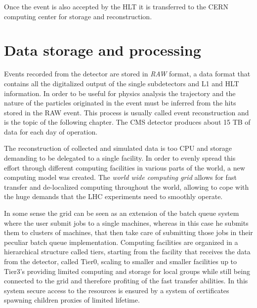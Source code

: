 Once the event is also accepted by the HLT it is transferred to the CERN computing center for storage and reconstruction.

\section{Data storage and processing}

Events recorded from the detector are stored in \emph{RAW} format, a data format that contains all the digitalized output of the single subdetectors and L1 and HLT information. In order to be useful for physics analysis the trajectory and the nature of the particles originated in the event must be inferred from the hits stored in the RAW event. This process is usually called event reconstruction and is the topic of the following chapter. The CMS detector produces about 15 TB of data for each day of operation.

The reconstruction of collected and simulated data is too CPU and storage demanding to be delegated to a single facility. In order to evenly spread this effort through different computing facilities in various parts of the world, a new computing model was created. The \emph{world wide computing grid} \cite{Malecki:2005gn} allows for fast transfer and de-localized computing throughout the world, allowing to cope with the huge demands that the LHC experiments need to smoothly operate. 

In some sense the grid can be seen as an extension of the batch queue system where the user submit jobs to a single machines, whereas in this case he submits them to clusters of machines, that then take care of submitting those jobs in their peculiar batch queue implementation. Computing facilities are organized in a hierarchical structure called tiers, starting from the facility that receives the data from the detector, called Tier0, scaling to smaller and smaller facilities up to Tier3's providing limited computing and storage for local groups while still being connected to the grid and therefore profiting of the fast transfer abilities. In this system secure access to the resources is ensured by a system of certificates spawning children proxies of limited lifetime.

